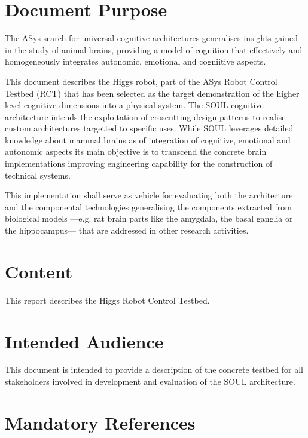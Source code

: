 
\section{Document Purpose}

The ASys search for universal cognitive architectures generalises insights
gained in the study of animal brains, providing a model of cognition that effectively and
homogeneously integrates autonomic, emotional and cogniitive aspects.

This document describes the Higgs robot, part of the ASys Robot Control Testbed
(RCT) that has been selected as the target demonstration of the higher level cognitive dimensions into a physical
system. The SOUL cognitive architecture intends the exploitation of croscutting
design patterns to realise custom architectures targetted to specific uses.
While SOUL leverages detailed knowledge about mammal brains as of integration of
cognitive, emotional and autonomic aspects its main objective is to transcend the concrete brain
implementations improving engineering
capability for the construction of technical systems.

This implementation shall serve as vehicle for evaluating both the architecture
and the componental technologies generalising the components extracted from
biological models ---e.g. rat brain parts like the amygdala, the basal ganglia
or the hippocampus--- that are addressed in other research activities.

\section{Content}

This report describes the Higgs Robot Control Testbed.


\section{Intended Audience}

This document is intended to provide a description of the concrete testbed for
all stakeholders involved in development and evaluation of the SOUL
architecture.

\section{Mandatory References}

